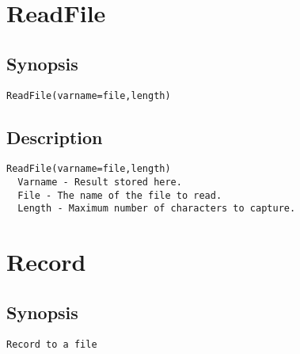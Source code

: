 \section{ReadFile}
\subsection{Synopsis}
\begin{verbatim}
ReadFile(varname=file,length)
\end{verbatim}
\subsection{Description}
\begin{verbatim}
ReadFile(varname=file,length)
  Varname - Result stored here.
  File - The name of the file to read.
  Length - Maximum number of characters to capture.

\end{verbatim}


\section{Record}
\subsection{Synopsis}
\begin{verbatim}
Record to a file
\end{verbatim}
